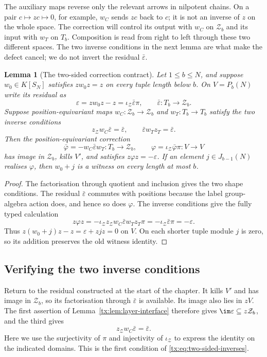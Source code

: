 \documentclass[11pt,a4paper,oneside,openany]{book}
\newtheorem{lemma}[theorem]{Lemma}
\theoremstyle{definition}\newtheorem{definition}[theorem]{Definition}
\theoremstyle{remark}\newtheorem{remark}[theorem]{Remark}
\numberwithin{equation}{chapter}
\begin{document}
The auxiliary maps reverse only the relevant arrows in nilpotent
chains. On a pair $c\mapsto zc\mapsto0$, for example, $w_C$ sends
$zc$ back to $c$; it is not an inverse of $z$ on the whole space.
The correction will control its output with $w_C$ on $\mathcal Z_b$
and its input with $w_T$ on $T_b$. Composition is read from right
to left through these two different spaces. The two inverse
conditions in the next lemma are what make the defect cancel;
we do not invert the residual $\bar\varepsilon$.

\begin{lemma}[The two-sided correction contract]\label{tx:lem:two-sided-correction}
Let $1\le b\le N$, and suppose $w_0\in K[S_N]$ satisfies $zw_0z=z$ on every tuple length below $b$. On $V=P_b(N)$ write its residual as
\[
 \varepsilon=zw_0z-z=\iota_{\mathcal Z}\bar\varepsilon\pi,
 \qquad \bar\varepsilon:T_b\longrightarrow\mathcal Z_b.
\]
Suppose position-equivariant maps $w_C:\mathcal Z_b\to\mathcal Z_b$ and $w_T:T_b\to T_b$ satisfy the two inverse conditions
\begin{equation}\label{tx:eq:two-sided-inverses}
 z_{\mathcal Z}w_C\bar\varepsilon=\bar\varepsilon,
 \qquad \bar\varepsilon w_Tz_T=\bar\varepsilon.
\end{equation}
Then the position-equivariant correction
\[
 \bar\varphi=-w_C\bar\varepsilon w_T:T_b\to\mathcal Z_b,
 \qquad \varphi=\iota_{\mathcal Z}\bar\varphi\pi:V\to V
\]
has image in $\mathcal Z_b$, kills $V'$, and satisfies $z\varphi z=-\varepsilon$. If an element $j\in J_{b-1}(N)$ realises $\varphi$, then $w_0+j$ is a witness on every length at most $b$.
\end{lemma}
\begin{proof}
The factorisation through quotient and inclusion gives the two shape conditions. The residual $\bar\varepsilon$ commutes with positions because the label group-algebra action does, and hence so does $\varphi$. The inverse conditions give the fully typed calculation
\[
 z\varphi z
 =-\iota_{\mathcal Z}z_{\mathcal Z}w_C\bar\varepsilon w_Tz_T\pi
 =-\iota_{\mathcal Z}\bar\varepsilon\pi
 =-\varepsilon.
\]
Thus $z(w_0+j)z-z=\varepsilon+zjz=0$ on $V$. On each shorter tuple module $j$ is zero, so its addition preserves the old witness identity.
\end{proof}

\subsection{Verifying the two inverse conditions}
Return to the residual constructed at the start of the chapter. It kills $V'$ and has image in $\mathcal Z_b$, so its factorisation through $\bar\varepsilon$ is available. Its image also lies in $zV$. The first assertion of Lemma~\ref{tx:lem:layer-interface} therefore gives $\im\varepsilon\subseteq z\mathcal Z_b$, and the third gives
\[
                       z_{\mathcal Z}w_C\bar\varepsilon=\bar\varepsilon.
\]
Here we use the surjectivity of $\pi$ and injectivity of
$\iota_{\mathcal Z}$ to express the identity on the indicated domains.
This is the first condition of \eqref{tx:eq:two-sided-inverses}.
\end{document}

